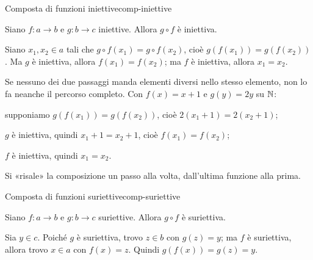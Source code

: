 \begin{concetto}
\begin{Teorema}{Composta di funzioni iniettive}{comp-iniettive}
    \begin{prerequisiti}
    \end{prerequisiti}
    Siano $f \colon a \to b$ e $g \colon b \to c$ iniettive. Allora $g \circ f$ è iniettiva.
\end{Teorema}
\begin{dimostrazione}
    Siano $x_1, x_2 \in a$ tali che $g \circ f(x_1) = g \circ f(x_2)$, cioè $g(f(x_1)) = g(f(x_2))$.
    Ma $g$ è iniettiva, allora $f(x_1) = f(x_2)$; ma $f$ è iniettiva, allora $x_1 = x_2$.
\end{dimostrazione}
\end{concetto}

\begin{spiegazione}
    Se nessuno dei due passaggi manda elementi diversi nello stesso elemento, non lo fa neanche il percorso completo. Con $f(x) = x + 1$ e $g(y) = 2y$ su $\mathbb{N}$:
    \begin{passi}
        \item supponiamo $g(f(x_1)) = g(f(x_2))$, cioè $2(x_1 + 1) = 2(x_2 + 1)$;
        \item $g$ è iniettiva, quindi $x_1 + 1 = x_2 + 1$, cioè $f(x_1) = f(x_2)$;
        \item $f$ è iniettiva, quindi $x_1 = x_2$.
    \end{passi}
    Si «risale» la composizione un passo alla volta, dall'ultima funzione alla prima.
\end{spiegazione}


\begin{concetto}
\begin{Teorema}{Composta di funzioni suriettive}{comp-suriettive}
    \begin{prerequisiti}
    \end{prerequisiti}
    Siano $f \colon a \to b$ e $g \colon b \to c$ suriettive. Allora $g \circ f$ è suriettiva.
\end{Teorema}
\begin{dimostrazione}
    Sia $y \in c$. Poiché $g$ è suriettiva, trovo $z \in b$ con $g(z) = y$; ma $f$ è suriettiva, allora trovo
    $x \in a$ con $f(x) = z$. Quindi $g(f(x)) = g(z) = y$.
\end{dimostrazione}
\end{concetto}

